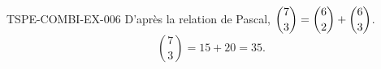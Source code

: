 \begin{corrige}{TSPE-COMBI-EX-006}
D'après la relation de Pascal, $\dbinom{7}{3} = \dbinom{6}{2}+\dbinom{6}{3}$.
\[
  \binom{7}{3} = 15+20 = \boxed{35}.
\]
\end{corrige}
